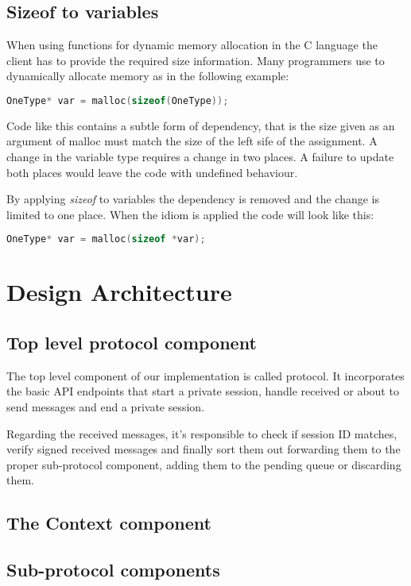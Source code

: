 \subsection{Sizeof to variables}
When using functions for dynamic memory allocation in the C language the client has to provide the required size information. Many programmers use to dynamically allocate memory as in the following example:
\begin{lstlisting}[language=C]
  OneType* var = malloc(sizeof(OneType));
\end{lstlisting}

Code like this contains a subtle form of dependency, that is the size given as an argument of malloc must match the size of the left sife of the assignment. A change in the variable type requires a change in two places. A failure to update both places would leave the code with undefined behaviour.

By applying \textit{sizeof} to variables the dependency is removed and the change is limited to one place. When the idiom is applied the code will look like this:
\begin{lstlisting}[language=C]
  OneType* var = malloc(sizeof *var);
\end{lstlisting}

\section{Design Architecture}

\subsection{Top level protocol component}
The top level component of our implementation is called protocol. It incorporates the basic API endpoints that start a private session, handle received or about to send messages and end a private session.

Regarding the received messages, it's responsible to check if session ID matches, verify signed received messages and finally sort them out forwarding them to the proper sub-protocol component, adding them to the pending queue or discarding them.

\subsection{The Context component}


\subsection{Sub-protocol components}

